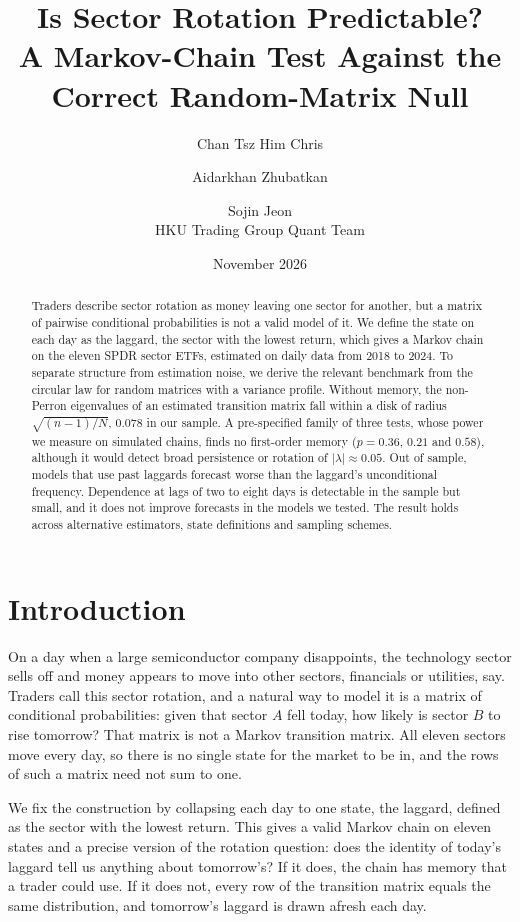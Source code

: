 \documentclass[11pt]{article}
\title{Is Sector Rotation Predictable?\\
A Markov-Chain Test Against the Correct Random-Matrix Null}
\author{Chan Tsz Him Chris \and Aidarkhan Zhubatkan \and Sojin Jeon\\[4pt]
\normalsize HKU Trading Group Quant Team}
\date{November 2026}
\begin{document}
\maketitle

\begin{abstract}
Traders describe sector rotation as money leaving one sector for another, but a matrix of pairwise conditional probabilities is not a valid model of it. We define the state on each day as the laggard, the sector with the lowest return, which gives a Markov chain on the eleven SPDR sector ETFs, estimated on daily data from 2018 to 2024. To separate structure from estimation noise, we derive the relevant benchmark from the circular law for random matrices with a variance profile. Without memory, the non-Perron eigenvalues of an estimated transition matrix fall within a disk of radius $\sqrt{(n-1)/N}$, 0.078 in our sample. A pre-specified family of three tests, whose power we measure on simulated chains, finds no first-order memory ($p = 0.36$, $0.21$ and $0.58$), although it would detect broad persistence or rotation of $|\lambda| \approx 0.05$. Out of sample, models that use past laggards forecast worse than the laggard's unconditional frequency. Dependence at lags of two to eight days is detectable in the sample but small, and it does not improve forecasts in the models we tested. The result holds across alternative estimators, state definitions and sampling schemes.
\end{abstract}

\clearpage
\section{Introduction}
\label{sec:intro}

On a day when a large semiconductor company disappoints, the technology sector sells off and money appears to move into other sectors, financials or utilities, say. Traders call this sector rotation, and a natural way to model it is a matrix of conditional probabilities: given that sector $A$ fell today, how likely is sector $B$ to rise tomorrow? That matrix is not a Markov transition matrix. All eleven sectors move every day, so there is no single state for the market to be in, and the rows of such a matrix need not sum to one.

We fix the construction by collapsing each day to one state, the laggard, defined as the sector with the lowest return. This gives a valid Markov chain on eleven states and a precise version of the rotation question: does the identity of today's laggard tell us anything about tomorrow's? If it does, the chain has memory that a trader could use. If it does not, every row of the transition matrix equals the same distribution, and tomorrow's laggard is drawn afresh each day.
\end{document}
